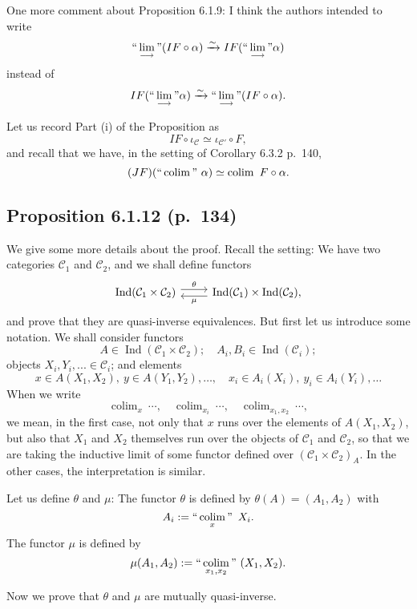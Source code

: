\documentclass[12pt]{article}
\theoremstyle{remark}
\theoremstyle{definition}
\newcommand{\C}{\mathcal C}
\newcommand{\colim}{\operatornamewithlimits{\underset{\longrightarrow}{lim}}}
\DeclareMathOperator*{\coli}{colim}
\DeclareMathOperator*{\co}{colim}
\DeclareMathOperator*{\ic}{``\coli"}
\DeclareMathOperator{\Ind}{Ind}
\begin{document}
One more comment about Proposition 6.1.9: I think the authors intended to write 
%
\begin{equation}\label{133ii}
``\colim"(IF\circ\alpha)\xrightarrow\sim IF(``\colim"\alpha)
\end{equation} 
%
instead of 
$$
IF(``\colim"\alpha)\xrightarrow\sim``\colim"(IF\circ\alpha). 
$$ 

Let us record Part (i) of the Proposition as 
%
\begin{equation}\label{133i}
IF\circ\iota_\C\simeq\iota_{\C'}\circ F, 
\end{equation} 
%
and recall that we have, in the setting of Corollary 6.3.2 p.~140, 
%
\begin{equation}\label{140}
(JF)(``\coli"\ \alpha)\simeq\coli\ F\circ\alpha.
\end{equation}
%
%
\subsection{Proposition 6.1.12 (p.~134)}
%
We give some more details about the proof. Recall the setting: We have two categories $\C_1$ and $\C_2$, and we shall define functors
$$
\begin{tikzcd}
\Ind(\C_1\times\C_2)\ar[yshift=0.7ex]{r}{\theta}&\Ind(\C_1)\times\Ind(\C_2),\ar[yshift=-0.7ex]{l}{\mu}
\end{tikzcd}
$$ 
and prove that they are quasi-inverse equivalences. But first let us introduce some notation. We shall consider functors 
$$
A\in\Ind(\C_1\times\C_2);\quad A_i,B_i\in\Ind(\C_i);
$$ 
objects $X_i,Y_i,...\in\C_i$; and elements 
$$
x\in A(X_1,X_2),\ y\in A(Y_1,Y_2),\dots,\quad x_i\in A_i(X_i),\ y_i\in A_i(Y_i),\dots
$$ 
When we write 
$$
\co_x\ \cdots,\quad\co_{x_i}\ \cdots,\quad\co_{x_1,x_2}\ \cdots,
$$ 
we mean, in the first case, not only that $x$ runs over the elements of $A(X_1,X_2)$, but also that $X_1$ and $X_2$ themselves run over the objects of $\C_1$ and $\C_2$, so that we are taking the inductive limit of some functor defined over $(\C_1\times\C_2)_A$. In the other cases, the interpretation is similar. 

Let us define $\theta$ and $\mu$: The functor $\theta$ is defined by $\theta(A)=(A_1,A_2)$ with
%
\begin{equation}\label{ai}
A_i:=\ic_x\ X_i. 
\end{equation}
%
The functor $\mu$ is defined by 
$$
\mu(A_1,A_2):=\ic_{x_1,x_2}\ (X_1,X_2). 
$$ 

Now we prove that $\theta$ and $\mu$ are mutually quasi-inverse.
\end{document}
